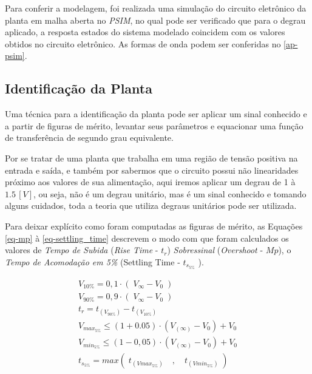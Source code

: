 \documentclass[
	12pt,				%
	article,			%
	openright,			%
	oneside,
	a4paper,			%
	chapter=TITLE,		%
	section=TITLE,		%
	english,			%
	french,				%
	spanish,			%
	brazil,				%
]{abntex2}
\begin{document}
    	Para conferir a modelagem, foi realizada uma simulação do circuito eletrônico da planta em malha aberta no \textit{PSIM}, no qual pode ser verificado que para o degrau aplicado, a resposta estados do sistema modelado coincidem com os valores obtidos no circuito eletrônico. As formas de onda podem ser conferidas no \autoref{ap-psim}.
    	
    	\subsection{Identificação da Planta}
    	
        	Uma técnica para a identificação da planta pode ser aplicar um sinal conhecido e a partir de figuras de mérito, levantar seus parâmetros e equacionar uma função de transferência de segundo grau equivalente.
        	
        	Por se tratar de uma planta que trabalha em uma região de tensão positiva na entrada e saída, e também por sabermos que o circuito possui não linearidades próximo aos valores de sua alimentação, aqui iremos aplicar um degrau de 1 à $1.5\,[V]$, ou seja, não é um degrau unitário, mas é um sinal conhecido e tomando alguns cuidados, toda a teoria que utiliza degraus unitários pode ser utilizada.
        	
        	Para deixar explícito como foram computadas as figuras de mérito, as Equações \ref{eq-mp} à \ref{eq-settling_time} descrevem o modo com que foram calculados os valores de \textit{Tempo de Subida} (\textit{Rise Time} - $t_r$) \textit{Sobressinal} (\textit{Overshoot} - $Mp$), o \textit{Tempo de Acomodação em 5\%} (Settling Time - $t_{s_{5\%}}$ ).
        	
        	\begin{eqnarray}
        		\nonumber
        		V_{10\%} = 0,1\cdot(\;V_{\infty} -V_{0}\;) \\
        		\nonumber
        		V_{90\%} = 0,9\cdot(\;V_{\infty} -V_{0}\;) \\
        		\label{eq-mp}
        		t_{r} = t_{(V_{90\%})} - t_{(V_{10\%})} \\
        		\nonumber
        		V_{max_{5\%}} \leq (1 +0.05) \cdot (V_{(\infty)} - V_{0}) +V_{0} \\
        		\nonumber
        		V_{min_{5\%}} \leq (1 -0,05) \cdot (V_{(\infty)} - V_{0}) +V_{0} \\
        		\label{eq-settling_time}
        		t_{s_{5\%}} = max\left(\; t_{(Vmax_{5\%})}\quad, \quad t_{(Vmin_{5\%})}\;\right)		
        	\end{eqnarray}
        	
\end{document}
